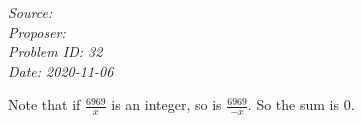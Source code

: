 \SSbreak
\emph{Source: \Cop}\\
\emph{Proposer:  \Pchan}\\
\emph{Problem ID: 32}\\
\emph{Date: 2020-11-06}\\
\SSbreak

\bigskip 

\begin{solution}\hfil\medskip

    Note that if $\frac{6969}x$ is an integer, so is $\frac{6969}{-x}$. So the sum is $\boxed{0}$.
\end{solution}\bigskip